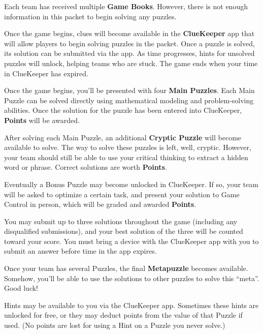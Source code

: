
Each team has received multiple \textbf{Game Books}. However, there is
not enough information in this packet to begin solving any puzzles.

Once the game begins, clues will become available in the \textbf{ClueKeeper} app that
will allow players to begin solving puzzles in the packet. Once a puzzle is
solved, its solution can be submitted via the app. As time progresses, hints
for unsolved puzzles will unlock, helping teams who are stuck. The game
ends when your time in ClueKeeper has expired.


Once the game begins, you'll be presented with four \textbf{Main Puzzles}. 
Each Main Puzzle can be solved directly using mathematical modeling
and problem-solving abilities. Once the solution for the puzzle has been
entered into ClueKeeper, \textbf{Points} will be awarded.


After solving each Main Puzzle, an additional
\textbf{Cryptic Puzzle} will become available to solve.
The way to solve these puzzles is left, well,
cryptic. However, your team should still be able to use your
critical thinking to extract a hidden word or phrase. Correct
solutions are worth \textbf{Points}.


Eventually a Bonus Puzzle may become unlocked
in ClueKeeper. If so, your team will be asked to optimize a certain task, and
present your solution to Game Control in person, which will be graded and
awarded \textbf{Points}.

You may submit up to three solutions throughout
the game (including any disqualified submissions), and your best solution of the
three will be counted toward your score. You must bring a device with the
ClueKeeper app with you to submit an answer before time in the app expires.


Once your team has several Puzzles, the final \textbf{Metapuzzle}
becomes available. Somehow, you'll be able to use the solutions to other puzzles
to solve this ``meta''. Good luck!


Hints may be available to you via the ClueKeeper app. Sometimes these hints
are unlocked for free, or they may deduct points from the value of that Puzzle
if used. (No points are lost for using a Hint on a Puzzle you never solve.)

